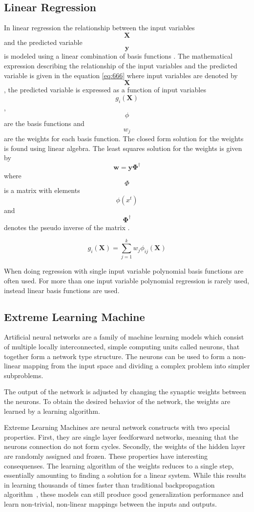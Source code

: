 \subsection{Linear Regression}
In linear regression the relationship between the input variables $$\mathbf{X}$$ and the predicted variable $$\mathbf{y}$$ is modeled using a linear combination of basis functions \cite{alpaydin:2004:introduction}. The mathematical expression describing the relationship of the input variables and the predicted variable is given in the equation \ref{eq:666} where input variables are denoted by $$\mathbf{X}$$, the predicted variable is expressed as a function of input variables $$g_{i}(\mathbf{X})$$, $$\phi$$ are the basis functions and $$w_{j}$$ are the weights for each basis function. The closed form solution for the weights is found using linear algebra. The least squares solution for the weights is given by $$\mathbold{w = y\Phi^{\dagger}}$$ where $$\Phi$$ is a matrix with elements $$\phi(x^{t})$$ and $$\mathbf{\Phi^{\dagger}}$$ denotes the pseudo inverse of the matrix \cite{alpaydin:2004:introduction}.

\begin{equation}
    \label{eq:666}
    g_{i}(\mathbf{X}) = \sum^{k}_{j=1}{w_{j}\phi_{ij}(\mathbf{X})}
\end{equation}

When doing regression with single input variable polynomial basis functions are often used. For more than one input variable polynomial regression is rarely used, instead linear basis functions are used. \cite{alpaydin:2004:introduction}

\subsection{Extreme Learning Machine}
Artificial neural networks are a family of machine learning models which consist of multiple locally interconnected, simple computing units called neurons, that together form a network type structure. The neurons can be used to form a non-linear mapping from the input space and dividing a complex problem into simpler subproblems.~\cite{haykin:2009:neural-networks}

The output of the network is adjusted by changing the synaptic weights between the neurons. To obtain the desired behavior of the network, the  weights are learned by a learning algorithm.~\cite{haykin:2009:neural-networks}

Extreme Learning Machines are neural network constructs with two special properties. First, they are single layer feedforward networks, meaning that the neurons connection do not form cycles. Secondly, the weights of the hidden layer are randomly assigned and frozen. These properties have interesting consequenses. The learning algorithm of the weights reduces to a single step, essentially amounting to finding a solution for a linear system. While this results in learning thousands of times faster than traditional backpropagation algorithm~\cite{haykin:2009:neural-networks}, these models can still produce good generalization performance and learn non-trivial, non-linear mappings between the inputs and outputs.~\cite{huang:2006:elm}

